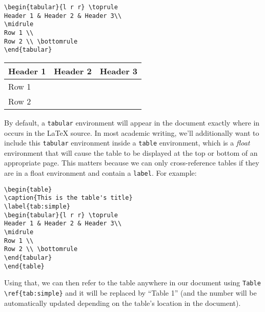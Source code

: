 \documentclass[11pt, a4paper]{article}
\begin{document}
\begin{minipage}{.45\textwidth}
\begin{verbatim}
\begin{tabular}{l r r} \toprule
Header 1 & Header 2 & Header 3\\
\midrule
Row 1 \\
Row 2 \\ \bottomrule
\end{tabular}
\end{verbatim}

\end{minipage}
\begin{minipage}{.45\textwidth}

\begin{tabular}{l r r} \toprule
Header 1 & Header 2 & Header 3\\ \midrule
Row 1 & & \\
Row 2 & & \\ \bottomrule
\end{tabular}

\end{minipage}

\vspace{2em}

\noindent By default, a \texttt{tabular} environment will appear in the document exactly where in occurs in the \LaTeX{} source. In most academic writing, we'll additionally want to include this \texttt{tabular} environment inside a \texttt{table} environment, which is a \textit{float} environment that will cause the table to be displayed at the top or bottom of an appropriate page. This matters because we can only cross-reference tables if they are in a float environment and contain a \texttt{label}. For example:

\begin{verbatim}
\begin{table}
\caption{This is the table's title}
\label{tab:simple}
\begin{tabular}{l r r} \toprule
Header 1 & Header 2 & Header 3\\
\midrule
Row 1 \\
Row 2 \\ \bottomrule
\end{tabular}
\end{table}
\end{verbatim}

\noindent Using that, we can then refer to the table anywhere in our document using \verb|Table \ref{tab:simple}| and it will be replaced by ``Table 1'' (and the number will be automatically updated depending on the table's location in the document).
\end{document}
